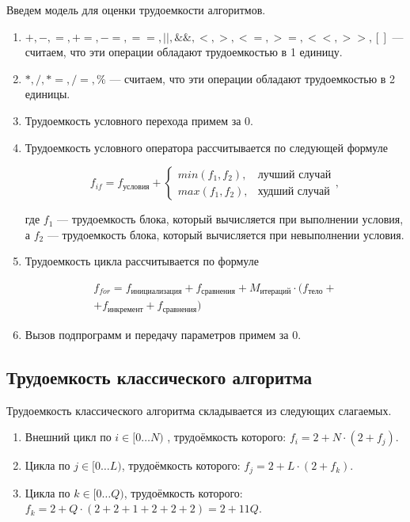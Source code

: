 Введем модель для оценки трудоемкости алгоритмов.
\begin{enumerate}
	\item $+, -, =, +=, -=, ==, ||, \&\&, <, >, <=, >=, <<, >>, []$ --- считаем, что эти операции обладают трудоемкостью в 1 единицу.
	\item $*, /, *=, /=, \% $ --- считаем, что эти операции обладают трудоемкостью в 2 единицы.
	\item Трудоемкость условного перехода примем за $0$.
	\item Трудоемкость условного оператора рассчитывается по следующей формуле
	
	\begin{equation}
		\label{eq:if}
		f_{if} = f_{\text{условия}} + 
		\begin{cases}
			min(f_1, f_2), & \text{лучший случай}\\
			max(f_1, f_2), & \text{худший случай}
		\end{cases},
	\end{equation}
	
	где $f_1$ --- трудоемкость блока, который вычисляется при выполнении условия, а $f_2$ --- трудоемкость блока, который вычисляется при невыполнении условия.
	\item Трудоемкость цикла рассчитывается по формуле
	
	\begin{equation}
		\label{eq:for}
		\begin{gathered}
			f_{for} = f_{\text{инициализация}} + f_{\text{сравнения}} + M_{\text{итераций}} \cdot (f_{\text{тело}} +\\
			+ f_{\text{инкремент}} + f_{\text{сравнения}})
		\end{gathered}
	\end{equation}
	
	\item Вызов подпрограмм и передачу параметров примем за $0$.
\end{enumerate}

\subsection{Трудоемкость классического алгоритма}

Трудоемкость классического алгоритма складывается из следующих слагаемых.
\begin{enumerate}
	\item Внешний цикл по $i \in [0 \ldots N)$ , трудоёмкость которого: $f_{i} = 2 + N \cdot (2 + f_{j})$.
	\item Цикла по $j \in [0 \ldots L)$, трудоёмкость которого: $f_{j} = 2 + L \cdot (2 + f_{k})$.
	\item Цикла по $k \in [0 \ldots Q)$, трудоёмкость которого: $f_{k} = 2 + Q \cdot (2 + 2 + 1 + 2 + 2 + 2) = 2 + 11Q$.
\end{enumerate}

